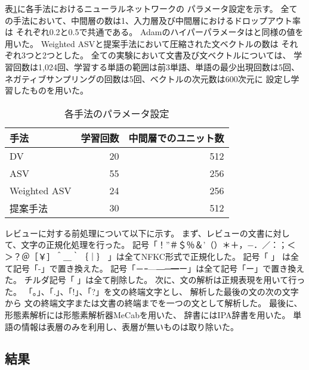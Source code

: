 
表\ref{tab:ParametersOfMethods}に各手法におけるニューラルネットワークの
パラメータ設定を示す。
全ての手法において、中間層の数は1、入力層及び中間層におけるドロップアウト率は
それぞれ0.2と0.5で共通である。
Adam\cite{diederik15}のハイパーパラメータは\cite{diederik15}と同様の値を
用いた。
Weighted ASVと提案手法において圧縮された文ベクトルの数は
それぞれ3つと2つとした。
全ての実験において文書及び文ベクトルについては、
学習回数は1,024回、学習する単語の範囲は前3単語、単語の最少出現回数は5回、
ネガティブサンプリングの回数は5回、ベクトルの次元数は600次元に
設定し学習したものを用いた。

\begin{table}
  \caption{各手法のパラメータ設定}
  \centering
  \begin{tabular}{l | r r} \label{tab:ParametersOfMethods}
    手法 & 学習回数 & 中間層でのユニット数 \\
    \hline
    DV & 20 & 512 \\
    ASV & 55 & 256 \\
    Weighted ASV & 24 & 256 \\
    提案手法 & 30 & 512 \\
  \end{tabular}
\end{table}

レビューに対する前処理について以下に示す。
まず、レビューの文書に対して、文字の正規化処理を行った。
記号「！”＃＄％＆’（）＊＋，−．／：；＜＞？＠［￥］＾＿｀｛｜｝
」は全てNFKC形式で正規化した。
記号「
」
は全て記号「-」で置き換えた。
記号「－ｰ—―─━ー」は全て記号「ー」で置き換えた。
チルダ記号「
」は全て削除した。
次に、文の解析は正規表現を用いて行った。
「。」、「.」、「!」、「?」を文の終端文字とし、
解析した最後の文の次の文字から
文の終端文字または文書の終端までを一つの文として解析した。
最後に、形態素解析には形態素解析器MeCabを用いた、
辞書にはIPA辞書を用いた。
単語の情報は表層のみを利用し、表層が無いものは取り除いた。


\subsection{結果}

